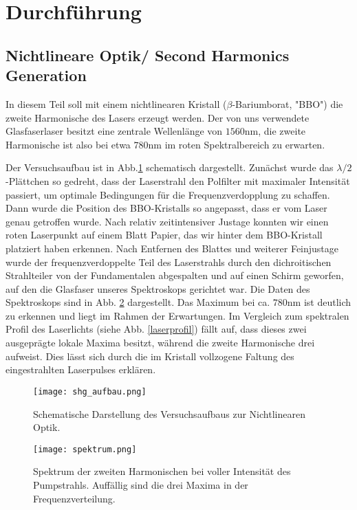 \documentclass[a4paper,12pt]{scrartcl}
\title{}
\author{Michael Rößner}
\date{\today}
\begin{document}
\section{Durchführung}
\subsection{Nichtlineare Optik/ Second Harmonics Generation}
In diesem Teil soll mit einem nichtlinearen Kristall ($\beta$-Bariumborat, "BBO") die zweite Harmonische des Lasers erzeugt werden. Der von uns verwendete Glasfaserlaser besitzt eine zentrale Wellenlänge von $1560\si{\nano\meter}$, die zweite Harmonische ist also bei etwa $780\si{\nano\meter}$ im roten Spektralbereich zu erwarten.
	
Der Versuchsaufbau ist in Abb.\ref{shg_aufbau} schematisch dargestellt.
Zunächst wurde das $\lambda/2$-Plättchen so gedreht, dass der Laserstrahl den Polfilter mit maximaler Intensität passiert, um optimale Bedingungen für die Frequenzverdopplung zu schaffen. Dann wurde die Position des BBO-Kristalls so angepasst, dass er vom Laser genau getroffen wurde. Nach relativ zeitintensiver Justage konnten wir einen roten Laserpunkt auf einem Blatt Papier, das wir hinter dem BBO-Kristall platziert haben erkennen. Nach Entfernen des Blattes und weiterer Feinjustage wurde der frequenzverdoppelte Teil des Laserstrahls durch den dichroitischen Strahlteiler von der Fundamentalen abgespalten und auf einen Schirm geworfen, auf den die Glasfaser unseres Spektroskops gerichtet war. Die Daten des Spektroskops sind in Abb. \ref{shg_spektrum} dargestellt. Das Maximum bei ca. $780\si{\nano\meter}$ ist deutlich zu erkennen und liegt im Rahmen der Erwartungen. Im Vergleich zum spektralen Profil des Laserlichts (siehe Abb. \ref{laserprofil}) fällt auf, dass dieses zwei ausgeprägte lokale Maxima besitzt, während die zweite Harmonische drei aufweist. Dies lässt sich durch die im Kristall vollzogene Faltung des eingestrahlten Laserpulses erklären.
	
\begin{figure}[H]
	\texttt{[image: shg\_aufbau.png]}
	\caption{Schematische Darstellung des Versuchsaufbaus zur Nichtlinearen Optik.}
	\label{shg_aufbau}
\end{figure}
	
\begin{figure}[H]
	\begin{center}
		
	\texttt{[image: spektrum.png]}
	\caption{Spektrum der zweiten Harmonischen bei voller Intensität des Pumpstrahls. Auffällig sind die drei Maxima in der Frequenzverteilung.}
	\label{shg_spektrum}
	\end{center}
\end{figure}
\end{document}

